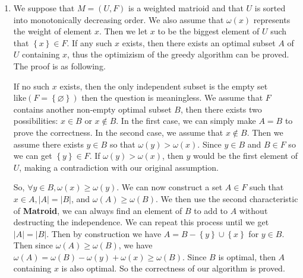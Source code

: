 \documentclass[12pt,a4paper]{article}
\makeatletter
\newtheorem*{solution}{Solution}
\theoremstyle{definition}
\renewenvironment{solution}[1][Solution] {\par\pushQED{\qed}\normalfont\topsep6\p@\@plus6\p@\relax\trivlist\item[\hskip\labelsep\bfseries#1\@addpunct{.}]\ignorespaces}{\popQED\endtrivlist\@endpefalse} \makeatother
\makeatother
\begin{document}
\begin{enumerate}
\begin{enumerate}
\begin{solution}
	        We suppose that $M = \left(U, F\right)$ is a weighted matrioid and that $U$ is sorted into monotonically decreasing order. We also assume that $ \omega \left( x \right)$ represents the weight of element $x$. Then we let $x$ to be the biggest element of $U$ such that $\left\{ x \right\} \in F $. If any such $x$ exists, then there exists an optimal subset $A$ of $U$ containing $x$, thus the optimizism of the greedy algorithm can be proved. The proof is as following. 
	        
	        If no such $x$ exists, then the only independent subset is the empty set $ \text {like} \left( F = \left\{ \varnothing \right\}\right)$ then the question is meaningless. We assume that $F$ contains another non-empty optimal subset
            $B$, then there exists two possibilities: $x \in B $ or $x \notin B$. In the first case, we can simply make $A = B$ to prove the correctness. In the second case, we 
            assume that $x \notin B$.
            Then we assume there exists $y \in B$ so that $\omega\left(y\right) > \omega\left(x\right)$. Since $y \in B$ and $B \in F$ so we can get $\left\{y\right\} \in F$.
            If $\omega\left(y\right) > \omega\left(x\right)$, then $y$ would be the first element of $U$, making a contradiction with our original assumption.

            So, $ \forall y \in B, \omega\left(x\right) \ge \omega\left(y\right)$.
            We can now construct a set $A \in F$ such that $x \in A,|A| =|B|$, and $\omega\left(A\right) \ge \omega\left(B\right)$. We then use the second characteristic of \textbf {Matroid}, we can always find an element of $B$ to add to $A$ without destructing the independence.
            We can repeat this process until we get $|A| =|B|$. Then by construction we have $A = B - \left\{y\right\} \cup \left\{x\right\} $ for $y \in B$. Then since $\omega\left(A\right) \ge \omega\left(B\right)$,
            we have $\omega\left(A\right) = \omega\left(B\right) - \omega\left(y\right) + \omega\left(x\right) \ge \omega\left(B\right)$. 
            Since $B$ is optimal, then $A$ containing $x$ is also optimal. So the correctness of our algorithm is proved.

	        
	
	    \end{solution}
\newpage


\end{enumerate}
\end{enumerate}
\end{document}
